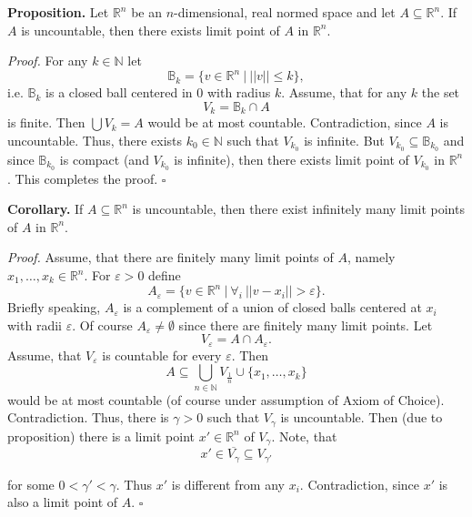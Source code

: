 \documentclass[12pt]{article}
\begin{document}
\textbf{Proposition.} Let $\mathbb{R}^n$ be an $n$-dimensional, real normed space and let $A\subseteq \mathbb{R}^n$. If $A$ is uncountable, then there exists limit point of $A$ in $\mathbb{R}^n$.

\textit{Proof.} For any $k\in\mathbb{N}$ let
$$\mathbb{B}_{k}=\{v\in\mathbb{R}^n\ |\ ||v||\leq k\},$$
i.e. $\mathbb{B}_k$ is a closed ball centered in $0$ with radius $k$. Assume, that for any $k$ the set 
$$V_k=\mathbb{B}_k\cap A$$
is finite. Then $\bigcup V_k=A$ would be at most countable. Contradiction, since $A$ is uncountable. Thus, there exists $k_0\in\mathbb{N}$ such that $V_{k_0}$ is infinite. But $V_{k_0}\subseteq\mathbb{B}_{k_0}$ and since $\mathbb{B}_{k_0}$ is compact (and $V_{k_0}$ is infinite), then there exists limit point of $V_{k_0}$ in $\mathbb{R}^n$. This completes the proof. $\square$

\textbf{Corollary.} If $A\subseteq\mathbb{R}^n$ is uncountable, then there exist infinitely many limit points of $A$ in $\mathbb{R}^n$.

\textit{Proof.} Assume, that there are finitely many limit points of $A$, namely $x_1,\ldots,x_k\in\mathbb{R}^n$. For $\varepsilon >0$ define
$$A_{\varepsilon}=\{v\in\mathbb{R}^n\ |\ \forall_{i}\ ||v-x_i||>\varepsilon\}.$$
Briefly speaking, $A_{\varepsilon}$ is a complement of a union of closed balls centered at $x_i$ with radii $\varepsilon$. Of course $A_{\varepsilon}\neq\emptyset$ since there are finitely many limit points. Let
$$V_{\varepsilon}=A\cap A_{\varepsilon}.$$
Assume, that $V_{\varepsilon}$ is countable for every $\varepsilon$. Then
$$A\subseteq \bigcup_{n\in\mathbb{N}}V_{\frac{1}{n}}\cup\{x_1,\ldots,x_k\}$$
would be at most countable (of course under assumption of Axiom of Choice). Contradiction. Thus, there is $\gamma > 0$ such that $V_{\gamma}$ is uncountable. Then (due to proposition) there is a limit point $x'\in\mathbb{R}^n$ of $V_{\gamma}$. Note, that 
$$x'\in \overline{V_{\gamma}}\subseteq V_{\gamma'}$$

for some $0 < \gamma' < \gamma $. Thus $x'$ is different from any $x_i$. Contradiction, since $x'$ is also a limit point of $A$. $\square$
\end{document}
